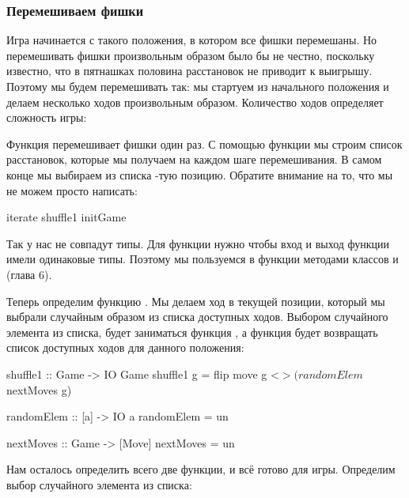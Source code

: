 \subsubsection{Перемешиваем фишки}

Игра начинается с такого положения, в котором все фишки перемешаны.
Но перемешивать фишки произвольным образом было бы не честно,
поскольку известно, что в пятнашках половина расстановок
не приводит к выигрышу. Поэтому мы будем перемешивать так: мы стартуем
из начального положения и делаем несколько ходов произвольным
образом. Количество ходов определяет сложность игры:


Функция  перемешивает фишки один раз. 
С помощью функции  мы строим список 
расстановок, которые мы получаем на каждом шаге перемешивания. 
В самом конце мы выбираем из списка -тую позицию. 
Обратите внимание на то, что мы не можем просто написать:

\begin{code}
iterate shuffle1 initGame
\end{code}

Так у нас не совпадут типы. Для функции  нужно
чтобы вход и выход функции имели одинаковые типы. 
Поэтому мы пользуемся в функции  методами
классов  и  (глава 6). 

Теперь определим функцию . Мы делаем ход в текущей 
позиции, который мы выбрали случайным образом из списка доступных 
ходов. Выбором случайного элемента из списка, будет заниматься 
функция , а функция  будет
возвращать список доступных ходов для данного положения:

\begin{code}
shuffle1 :: Game -> IO Game
shuffle1 g = flip move g <$> (randomElem $ nextMoves g)

randomElem :: [a] -> IO a
randomElem = un

nextMoves :: Game -> [Move]
nextMoves = un
\end{code}

Нам осталось определить всего две функции, и всё готово для игры.
Определим выбор случайного элемента из списка:

